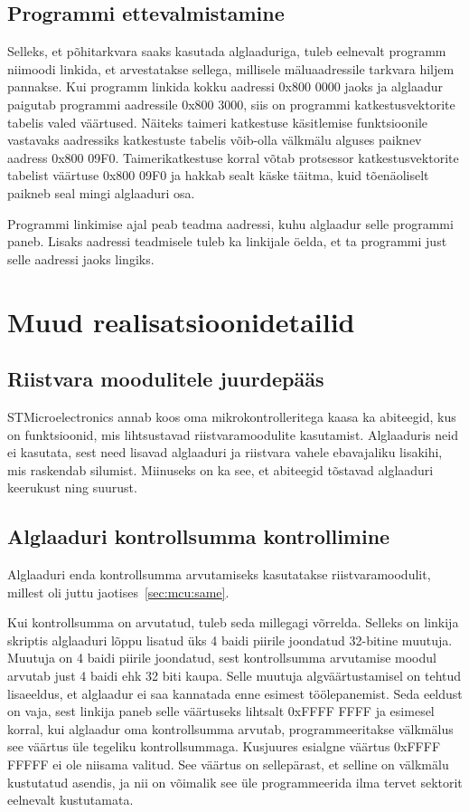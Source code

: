 \documentclass[12pt,a4paper]{article}
\begin{document}
\subsection{Programmi ettevalmistamine}
\label{sec:boot:prep}
Selleks, et põhitarkvara saaks kasutada alglaaduriga, tuleb eelnevalt programm
niimoodi linkida, et arvestatakse sellega, millisele mäluaadressile tarkvara
hiljem pannakse. Kui programm linkida kokku aadressi 0x800 0000 jaoks ja
alglaadur paigutab programmi aadressile 0x800 3000, siis on programmi
katkestusvektorite tabelis valed väärtused. Näiteks taimeri katkestuse
käsitlemise funktsioonile vastavaks aadressiks katkestuste tabelis võib-olla
välkmälu alguses paiknev aadress 0x800 09F0. Taimerikatkestuse korral võtab
protsessor katkestusvektorite tabelist väärtuse 0x800 09F0 ja hakkab sealt käske
täitma, kuid tõenäoliselt paikneb seal mingi alglaaduri osa.

Programmi linkimise ajal peab teadma aadressi, kuhu alglaadur selle programmi
paneb. Lisaks aadressi teadmisele tuleb ka linkijale öelda, et ta programmi just
selle aadressi jaoks lingiks.

\section{Muud realisatsioonidetailid}
\subsection{Riistvara moodulitele juurdepääs}
STMicroelectronics annab koos oma mikrokontrolleritega kaasa ka abiteegid, kus
on funktsioonid, mis lihtsustavad riistvaramoodulite kasutamist. Alglaaduris neid
ei kasutata, sest need lisavad alglaaduri ja riistvara vahele ebavajaliku
lisakihi, mis raskendab silumist. Miinuseks on ka see, et abiteegid
tõstavad alglaaduri keerukust ning suurust.

\subsection{Alglaaduri kontrollsumma kontrollimine}
Alglaaduri enda kontrollsumma arvutamiseks kasutatakse riistvaramoodulit,
millest oli juttu jaotises~\ref{sec:mcu:same}.

Kui kontrollsumma on arvutatud, tuleb seda millegagi võrrelda. Selleks on
linkija skriptis alglaaduri lõppu lisatud üks 4 baidi piirile joondatud
32-bitine muutuja. Muutuja on 4 baidi piirile joondatud, sest kontrollsumma
arvutamise moodul arvutab just 4 baidi ehk 32 biti kaupa. Selle muutuja
algväärtustamisel on tehtud lisaeeldus, et alglaadur ei saa kannatada enne
esimest töölepanemist. Seda eeldust on vaja, sest linkija paneb selle väärtuseks
lihtsalt 0xFFFF FFFF ja esimesel korral, kui alglaadur oma kontrollsumma
arvutab, programmeeritakse välkmälus see väärtus üle tegeliku kontrollsummaga.
Kusjuures esialgne väärtus 0xFFFF FFFFF ei ole niisama valitud. See väärtus on
sellepärast, et selline on välkmälu kustutatud asendis, ja nii on võimalik see
üle programmeerida ilma tervet sektorit eelnevalt kustutamata.
\end{document}

